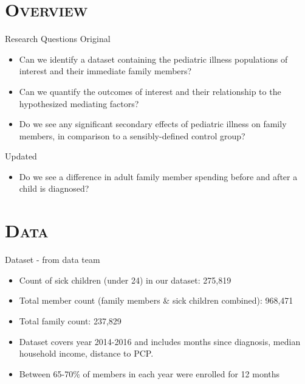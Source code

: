 \documentclass[xcolor=x11names,compress]{beamer}
\renewcommand{\(}{\begin{columns}}
\renewcommand{\)}{\end{columns}}
\newcommand{\<}[1]{\begin{column}{#1}}
\renewcommand{\>}{\end{column}}
\begin{document}


\section{\scshape Overview}

\begin{frame}{Research Questions}
Original
\begin{itemize}
	\item Can we identify a dataset containing the pediatric illness populations of interest and their immediate family members? 
	\item Can we quantify the outcomes of interest and their relationship to the hypothesized mediating factors? 
	\item Do we see any significant secondary effects of pediatric illness on family members, in comparison to a sensibly-defined control group? 
\end{itemize}
Updated 
\begin{itemize}
	\item Do we see a difference in adult family member spending before and after a child is diagnosed?
\end{itemize}
\end{frame}

\section{\scshape Data}

\begin{frame}{Dataset - from data team}
\begin{itemize}
	\item Count of sick children (under 24) in our dataset:  275,819
	\item Total member count (family members \& sick children combined): 968,471
	\item Total family count: 237,829
	\item Dataset covers year 2014-2016 and includes months since diagnosis, median household income, distance to PCP. 
	\item Between 65-70\% of members in each year were enrolled for 12 months
\end{itemize}
\end{frame}
\end{document}
